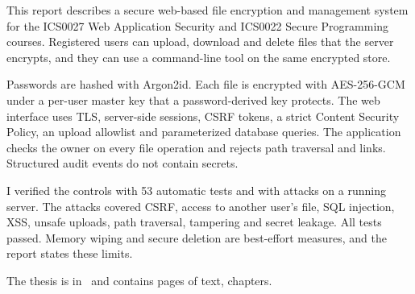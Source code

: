 This report describes a secure web-based file encryption and management system for the ICS0027 Web Application Security and ICS0022 Secure Programming courses. Registered users can upload, download and delete files that the server encrypts, and they can use a command-line tool on the same encrypted store.

Passwords are hashed with Argon2id. Each file is encrypted with AES-256-GCM under a per-user master key that a password-derived key protects. The web interface uses TLS, server-side sessions, CSRF tokens, a strict Content Security Policy, an upload allowlist and parameterized database queries. The application checks the owner on every file operation and rejects path traversal and links. Structured audit events do not contain secrets.

I verified the controls with 53 automatic tests and with attacks on a running server. The attacks covered CSRF, access to another user's file, SQL injection, XSS, unsafe uploads, path traversal, tampering and secret leakage. All tests passed. Memory wiping and secure deletion are best-effort measures, and the report states these limits.

The thesis is in \langEng~and contains \calculatepages pages of text, 
 chapters.
